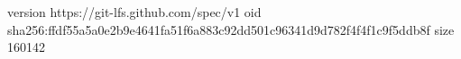 version https://git-lfs.github.com/spec/v1
oid sha256:ffdf55a5a0e2b9e4641fa51f6a883c92dd501c96341d9d782f4f4f1c9f5ddb8f
size 160142
